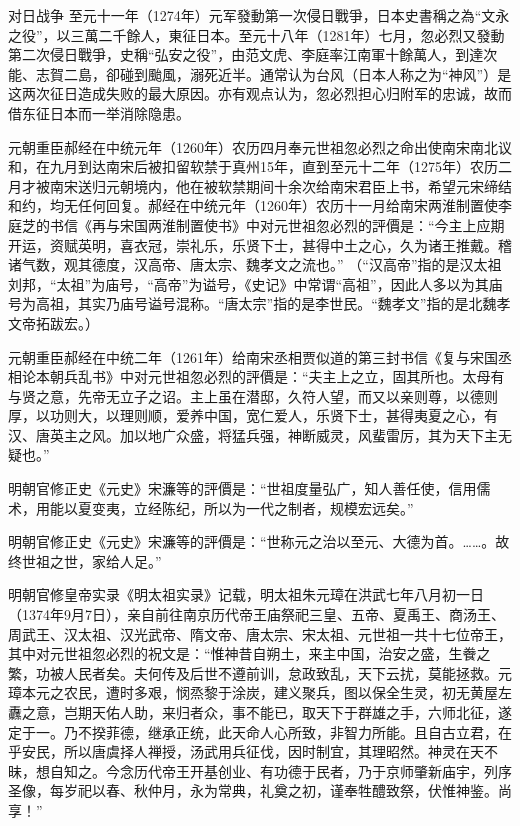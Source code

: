 对日战争 至元十一年（1274年）元军發動第一次侵日戰爭，日本史書稱之為“文永之役”，以三萬二千餘人，東征日本。至元十八年（1281年）七月，忽必烈又發動第二次侵日戰爭，史稱“弘安之役”，由范文虎、李庭率江南軍十餘萬人，到達次能、志賀二島，卻碰到颱風，溺死近半。通常认为台风（日本人称之为“神风”）是这两次征日造成失败的最大原因。亦有观点认为，忽必烈担心归附军的忠诚，故而借东征日本而一举消除隐患。

元朝重臣郝经在中统元年（1260年）农历四月奉元世祖忽必烈之命出使南宋南北议和，在九月到达南宋后被扣留软禁于真州15年，直到至元十二年（1275年）农历二月才被南宋送归元朝境内，他在被软禁期间十余次给南宋君臣上书，希望元宋缔结和约，均无任何回复。郝经在中统元年（1260年）农历十一月给南宋两淮制置使李庭芝的书信《再与宋国两淮制置使书》中对元世祖忽必烈的評價是：“今主上应期开运，资赋英明，喜衣冠，崇礼乐，乐贤下士，甚得中土之心，久为诸王推戴。稽诸气数，观其德度，汉高帝、唐太宗、魏孝文之流也。” （“汉高帝”指的是汉太祖刘邦，“太祖”为庙号，“高帝”为谥号，《史记》中常谓“高祖”，因此人多以为其庙号为高祖，其实乃庙号谥号混称。“唐太宗”指的是李世民。“魏孝文”指的是北魏孝文帝拓跋宏。）

元朝重臣郝经在中统二年（1261年）给南宋丞相贾似道的第三封书信《复与宋国丞相论本朝兵乱书》中对元世祖忽必烈的評價是：“夫主上之立，固其所也。太母有与贤之意，先帝无立子之诏。主上虽在潜邸，久符人望，而又以亲则尊，以德则厚，以功则大，以理则顺，爱养中国，宽仁爱人，乐贤下士，甚得夷夏之心，有汉、唐英主之风。加以地广众盛，将猛兵强，神断威灵，风蜚雷厉，其为天下主无疑也。”

明朝官修正史《元史》宋濂等的評價是：“世祖度量弘广，知人善任使，信用儒术，用能以夏变夷，立经陈纪，所以为一代之制者，规模宏远矣。”

明朝官修正史《元史》宋濂等的評價是：“世称元之治以至元、大德为首。……。故终世祖之世，家给人足。”

明朝官修皇帝实录《明太祖实录》记载，明太祖朱元璋在洪武七年八月初一日（1374年9月7日），亲自前往南京历代帝王庙祭祀三皇、五帝、夏禹王、商汤王、周武王、汉太祖、汉光武帝、隋文帝、唐太宗、宋太祖、元世祖一共十七位帝王，其中对元世祖忽必烈的祝文是：“惟神昔自朔土，来主中国，治安之盛，生餋之繁，功被人民者矣。夫何传及后世不遵前训，怠政致乱，天下云扰，莫能拯救。元璋本元之农民，遭时多艰，悯烝黎于涂炭，建义聚兵，图以保全生灵，初无黄屋左纛之意，岂期天佑人助，来归者众，事不能已，取天下于群雄之手，六师北征，遂定于一。乃不揆菲德，继承正统，此天命人心所致，非智力所能。且自古立君，在乎安民，所以唐虞择人禅授，汤武用兵征伐，因时制宜，其理昭然。神灵在天不昧，想自知之。今念历代帝王开基创业、有功德于民者，乃于京师肇新庙宇，列序圣像，每岁祀以春、秋仲月，永为常典，礼奠之初，谨奉牲醴致祭，伏惟神鉴。尚享！”


